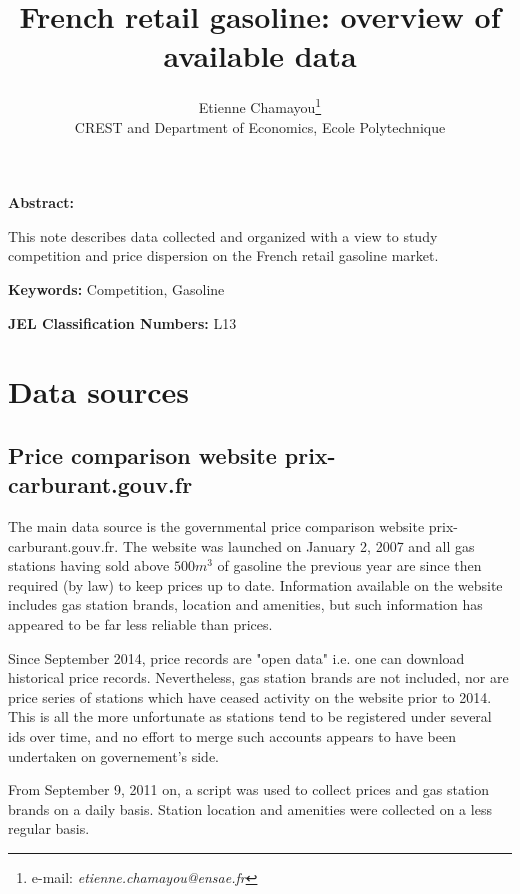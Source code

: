 \documentclass[11pt]{article}
\begin{document}
\title{French retail gasoline: overview of available data}
\author{Etienne Chamayou\thanks{e-mail:
\textit{etienne.chamayou@ensae.fr}}\medskip\\{\normalsize CREST and Department of Economics, Ecole Polytechnique }}
\maketitle

\sloppy%

\onehalfspacing

\textbf{Abstract:}

This note describes data collected and organized with a view to study competition and price dispersion on the French retail gasoline market.

\strut

\textbf{Keywords:} Competition, Gasoline

\strut

\textbf{JEL Classification Numbers:} L13

\pagebreak%

\section{Data sources}

\subsection{Price comparison website prix-carburant.gouv.fr}

The main data source is the governmental price comparison website prix-carburant.gouv.fr. The website was launched on January 2, 2007 and all gas stations having sold above $500m^3$ of gasoline the previous year are since then required (by law) to keep prices up to date. Information available on the website includes gas station brands, location and amenities, but such information has appeared to be far less reliable than prices.

Since September 2014, price records are "open data" i.e. one can download historical price records. Nevertheless, gas station brands are not included, nor are price series of stations which have ceased activity on the website prior to 2014. This is all the more unfortunate as stations tend to be registered under several ids over time, and no effort to merge such accounts appears to have been undertaken on governement's side.

From September 9, 2011 on, a script was used to collect prices and gas station brands on a daily basis. Station location and amenities were collected on a less regular basis.
\end{document}

